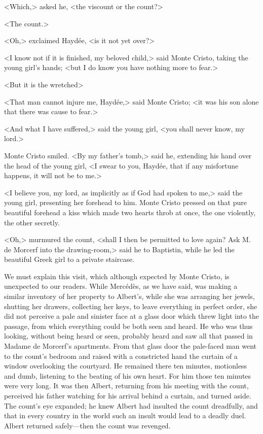  <Which,> asked he, <the viscount or the count?> 

 <The count.> 

 <Oh,> exclaimed Haydée, <is it not yet over?> 

 <I know not if it is finished, my beloved child,> said Monte Cristo, taking the young girl's hands; <but I do know you have nothing more to fear.> 

 <But it is the wretched\longdash> 

 <That man cannot injure me, Haydée,> said Monte Cristo; <it was his son alone that there was cause to fear.> 

 <And what I have suffered,> said the young girl, <you shall never know, my lord.> 

 Monte Cristo smiled. <By my father's tomb,> said he, extending his hand over the head of the young girl, <I swear to you, Haydée, that if any misfortune happens, it will not be to me.> 

 <I believe you, my lord, as implicitly as if God had spoken to me,> said the young girl, presenting her forehead to him. Monte Cristo pressed on that pure beautiful forehead a kiss which made two hearts throb at once, the one violently, the other secretly. 

 <Oh,> murmured the count, <shall I then be permitted to love again? Ask M. de Morcerf into the drawing-room,> said he to Baptistin, while he led the beautiful Greek girl to a private staircase. 

 We must explain this visit, which although expected by Monte Cristo, is unexpected to our readers. While Mercédès, as we have said, was making a similar inventory of her property to Albert's, while she was arranging her jewels, shutting her drawers, collecting her keys, to leave everything in perfect order, she did not perceive a pale and sinister face at a glass door which threw light into the passage, from which everything could be both seen and heard. He who was thus looking, without being heard or seen, probably heard and saw all that passed in Madame de Morcerf's apartments. From that glass door the pale-faced man went to the count's bedroom and raised with a constricted hand the curtain of a window overlooking the courtyard. He remained there ten minutes, motionless and dumb, listening to the beating of his own heart. For him those ten minutes were very long. It was then Albert, returning from his meeting with the count, perceived his father watching for his arrival behind a curtain, and turned aside. The count's eye expanded; he knew Albert had insulted the count dreadfully, and that in every country in the world such an insult would lead to a deadly duel. Albert returned safely—then the count was revenged. 

